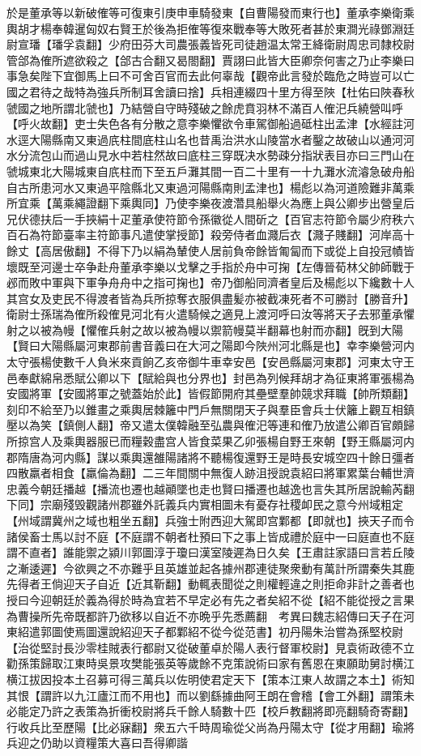 於是董承等以新破傕等可復東引庚申車騎發東【自曹陽發而東行也】董承李樂衛乘輿胡才楊奉韓暹匈奴右賢王於後為拒傕等復來戰奉等大敗死者甚於東澗光祿鄧淵廷尉宣璠【璠孚袁翻】少府田芬大司農張義皆死司徒趙温太常王絳衛尉周忠司隸校尉管郃為傕所遮欲殺之【郃古合翻又曷閤翻】賈詡曰此皆大臣卿奈何害之乃止李樂曰事急矣陛下宜御馬上曰不可舍百官而去此何辜哉【觀帝此言發於臨危之時豈可以亡國之君待之哉特為強兵所制耳舍讀曰捨】兵相連綴四十里方得至陜【杜佑曰陜春秋虢國之地所謂北虢也】乃結營自守時殘破之餘虎賁羽林不滿百人傕汜兵繞營叫呼【呼火故翻】吏士失色各有分散之意李樂懼欲令車駕御船過砥柱出孟津【水經註河水逕大陽縣南又東過㡳柱間底柱山名也昔禹治洪水山陵當水者鑿之故破山以通河河水分流包山而過山見水中若柱然故曰底柱三穿既决水勢疎分指狀表目亦曰三門山在虢城東北大陽城東自㡳柱而下至五戶灘其間一百二十里有一十九灘水流濬急破舟船自古所患河水又東過平陰縣北又東過河陽縣南則孟津也】楊彪以為河道險難非萬乘所宜乘【萬乘繩證翻下乘輿同】乃使李樂夜渡濳具船舉火為應上與公卿步出營皇后兄伏德扶后一手挾絹十疋董承使符節令孫徽從人間斫之【百官志符節令屬少府秩六百石為符節臺率主符節事凡遣使掌授節】殺旁侍者血濺后衣【濺子賤翻】河岸高十餘丈【高居傲翻】不得下乃以絹為輦使人居前負帝餘皆匍匐而下或從上自投冠幘皆壞既至河邊士卒争赴舟董承李樂以戈擊之手指於舟中可掬【左傳晉荀林父帥師戰于邲而敗中軍與下軍争舟舟中之指可掬也】帝乃御船同濟者皇后及楊彪以下纔數十人其宫女及吏民不得渡者皆為兵所掠奪衣服俱盡髪亦被截凍死者不可勝討【勝音升】衛尉士孫瑞為傕所殺傕見河北有火遣騎候之適見上渡河呼曰汝等將天子去邪董承懼射之以被為幔【懼傕兵射之故以被為幔以禦箭幔莫半翻幕也射而亦翻】旣到大陽【賢曰大陽縣屬河東郡前書音義曰在大河之陽即今陜州河北縣是也】幸李樂營河内太守張楊使數千人負米來貢餉乙亥帝御牛車幸安邑【安邑縣屬河東郡】河東太守王邑奉獻綿帛悉賦公卿以下【賦給與也分界也】封邑為列候拜胡才為征東將軍張楊為安國將軍【安國將軍之號蓋始於此】皆假節開府其壘壁羣帥競求拜職【帥所類翻】刻印不給至乃以錐畫之乘輿居棘籬中門戶無關閉天子與羣臣會兵士伏籬上觀互相鎮壓以為笑【鎮側人翻】帝又遣太僕韓融至弘農與傕汜等連和傕乃放遣公卿百官頗歸所掠宫人及乘輿器服已而糧穀盡宫人皆食菜果乙卯張楊自野王來朝【野王縣屬河内郡隋唐為河内縣】謀以乘輿還雒陽諸將不聽楊復還野王是時長安城空四十餘日彊者四散羸者相食【羸倫為翻】二三年間關中無復人跡沮授說袁紹曰將軍累葉台輔世濟忠義今朝廷播越【播流也遷也越顚墜也走也賢曰播遷也越逸也言失其所居說輸芮翻下同】宗廟殘毁觀諸州郡雖外託義兵内實相圖未有憂存社稷卹民之意今州域粗定【州域謂冀州之域也粗坐五翻】兵強士附西迎大駕即宫鄴都【即就也】挾天子而令諸侯畜士馬以討不庭【不庭謂不朝者杜預曰下之事上皆成禮於庭中一曰庭直也不庭謂不直者】誰能禦之潁川郭圖淳于瓊曰漢室陵遲為日久矣【王肅註家語曰言若丘陵之漸逶遲】今欲興之不亦難乎且英雄並起各據州郡連徒聚衆動有萬計所謂秦失其鹿先得者王倘迎天子自近【近其靳翻】動輒表聞從之則權輕違之則拒命非計之善者也授曰今迎朝廷於義為得於時為宜若不早定必有先之者矣紹不從【紹不能從授之言果為曹操所先帝既都許乃欲移以自近不亦晩乎先悉薦翻　考異曰魏志紹傳曰天子在河東紹遣郭圖使焉圖還說紹迎天子都鄴紹不從今從范書】初丹陽朱治嘗為孫堅校尉【治從堅討長沙零桂賊表行都尉又從破董卓於陽人表行督軍校尉】見袁術政德不立勸孫策歸取江東時吳景攻樊能張英等歲餘不克策說術曰家有舊恩在東願助舅討横江横江拔因投本土召募可得三萬兵以佐明使君定天下【策本江東人故謂之本土】術知其恨【謂許以九江廬江而不用也】而以劉繇據曲阿王朗在會稽【會工外翻】謂策未必能定乃許之表策為折衝校尉將兵千餘人騎數十匹【校戶教翻將即亮翻騎奇寄翻】行收兵比至歷陽【比必寐翻】衆五六千時周瑜從父尚為丹陽太守【從才用翻】瑜將兵迎之仍助以資糧策大喜曰吾得卿諧